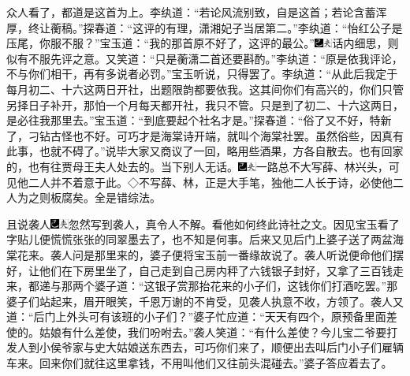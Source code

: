 众人看了，都道是这首为上。李纨道：``若论风流别致，自是这首；若论含蓄浑厚，终让蘅稿。''探春道：``这评的有理，潇湘妃子当居第二。''李纨道：``怡红公子是压尾，你服不服？''宝玉道：``我的那首原不好了，这评的最公。''{\includegraphics[width=3mm]{../Images/00003}\includegraphics[width=3mm]{../Images/00012}\footnotesize \kaishu 话内细思，则似有不服先评之意。}又笑道：``只是蘅潇二首还要斟酌。''李纨道：``原是依我评论，不与你们相干，再有多说者必罚。''宝玉听说，只得罢了。李纨道：``从此后我定于每月初二、十六这两日开社，出题限韵都要依我。这其间你们有高兴的，你们只管另择日子补开，那怕一个月每天都开社，我只不管。只是到了初二、十六这两日，是必往我那里去。''宝玉道：``到底要起个社名才是。''探春道：``俗了又不好，特新了，刁钻古怪也不好。可巧才是海棠诗开端，就叫个海棠社罢。虽然俗些，因真有此事，也就不碍了。''说毕大家又商议了一回，略用些酒果，方各自散去。也有回家的，也有往贾母王夫人处去的。当下别人无话。{\includegraphics[width=3mm]{../Images/00003}\includegraphics[width=3mm]{../Images/00012}\footnotesize \kaishu 一路总不大写薛、林兴头，可见他二人并不着意于此。◇不写薛、林，正是大手笔，独他二人长于诗，必使他二人为之则板腐矣。全是错综法。}

且说袭人{\includegraphics[width=3mm]{../Images/00003}\includegraphics[width=3mm]{../Images/00012}\footnotesize \kaishu 忽然写到袭人，真令人不解。看他如何终此诗社之文。}因见宝玉看了字贴儿便慌慌张张的同翠墨去了，也不知是何事。后来又见后门上婆子送了两盆海棠花来。袭人问是那里来的，婆子便将宝玉前一番缘故说了。袭人听说便命他们摆好，让他们在下房里坐了，自己走到自己房内秤了六钱银子封好，又拿了三百钱走来，都递与那两个婆子道：``这银子赏那抬花来的小子们，这钱你们打酒吃罢。''那婆子们站起来，眉开眼笑，千恩万谢的不肯受，见袭人执意不收，方领了。袭人又道：``后门上外头可有该班的小子们？''婆子忙应道：``天天有四个，原预备里面差使的。姑娘有什么差使，我们吩咐去。''袭人笑道：``有什么差使？今儿宝二爷要打发人到小侯爷家与史大姑娘送东西去，可巧你们来了，顺便出去叫后门小子们雇辆车来。回来你们就往这里拿钱，不用叫他们又往前头混碰去。''婆子答应着去了。

